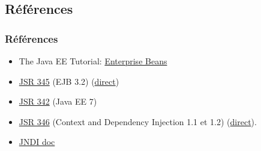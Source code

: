 \documentclass[english, french]{beamer}
\begin{document}
\subsection{Références}
\begin{frame}
	\frametitle{Références}
	\begin{itemize}
		\item The Java EE Tutorial: \href{https://docs.oracle.com/javaee/7/tutorial/partentbeans.htm}{Enterprise Beans}
		\item \href{https://www.jcp.org/en/jsr/detail?id=345}{JSR 345} (EJB 3.2) (\href{http://download.oracle.com/otn-pub/jcp/ejb-3_2-fr-eval-spec/ejb-3_2-core-fr-spec.pdf}{direct})
		\item \href{https://www.jcp.org/en/jsr/detail?id=342}{JSR 342} (Java EE 7)
		\item \href{http://jcp.org/en/jsr/detail?id=346}{JSR 346} (Context and Dependency Injection 1.1 et 1.2) (\href{http://download.oracle.com/otn-pub/jcp/cdi-1_2-mrel-eval-spec/cdi-1.2.pdf}{direct}).
		\item \href{https://docs.oracle.com/javase/8/docs/technotes/guides/jndi/}{JNDI doc}
	\end{itemize}
\end{frame}
\end{document}
